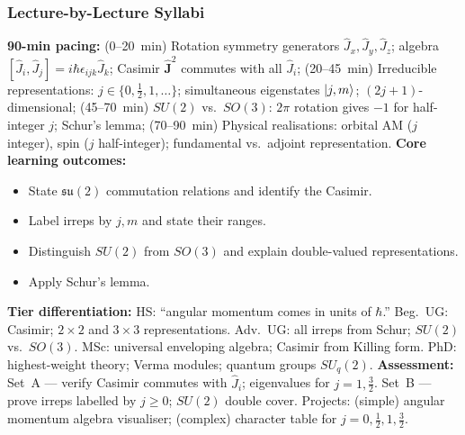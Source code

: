 \documentclass[11pt,a4paper]{article}
\begin{document}
\subsubsection*{Lecture-by-Lecture Syllabi}

\begin{tcolorbox}[modulebox, title={Module~II.3 --- Lecture L01: The $\mathfrak{su}(2)$ Algebra}]
\textbf{90-min pacing:} (0--20~min) Rotation symmetry generators $\hat{J}_x,\hat{J}_y,\hat{J}_z$; algebra $[\hat{J}_i,\hat{J}_j]=i\hbar\epsilon_{ijk}\hat{J}_k$; Casimir $\hat{\mathbf{J}}^2$ commutes with all $\hat{J}_i$; (20--45~min) Irreducible representations: $j\in\{0,\tfrac{1}{2},1,\ldots\}$; simultaneous eigenstates $\ket{j,m}$; $(2j+1)$-dimensional; (45--70~min) $SU(2)$ vs.\ $SO(3)$: $2\pi$ rotation gives $-1$ for half-integer $j$; Schur's lemma; (70--90~min) Physical realisations: orbital AM ($j$ integer), spin ($j$ half-integer); fundamental vs.\ adjoint representation.
\medskip\textbf{Core learning outcomes:}
\begin{itemize}[leftmargin=1.4em,topsep=2pt,itemsep=1pt]
  \item State $\mathfrak{su}(2)$ commutation relations and identify the Casimir.
  \item Label irreps by $j,m$ and state their ranges.
  \item Distinguish $SU(2)$ from $SO(3)$ and explain double-valued representations.
  \item Apply Schur's lemma.
\end{itemize}
\medskip\textbf{Tier differentiation:}
HS: ``angular momentum comes in units of $\hbar$.''
Beg.\ UG: Casimir; $2\times2$ and $3\times3$ representations.
Adv.\ UG: all irreps from Schur; $SU(2)$ vs.\ $SO(3)$.
MSc: universal enveloping algebra; Casimir from Killing form.
PhD: highest-weight theory; Verma modules; quantum groups $SU_q(2)$.
\medskip\textbf{Assessment:}
Set~A --- verify Casimir commutes with $\hat{J}_i$; eigenvalues for $j=1,\tfrac{3}{2}$.
Set~B --- prove irreps labelled by $j\geq 0$; $SU(2)$ double cover.
Projects: (simple) angular momentum algebra visualiser; (complex) character table for $j=0,\tfrac{1}{2},1,\tfrac{3}{2}$.
\end{tcolorbox}

\medskip
\end{document}
